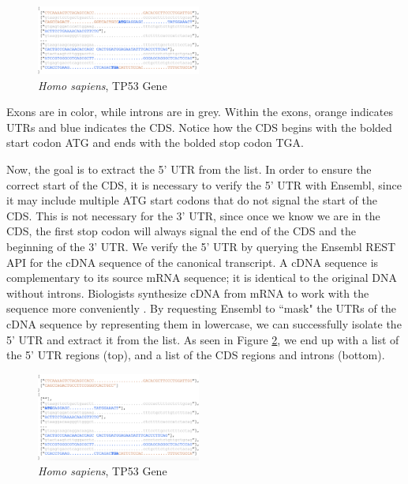 \documentclass[letterpaper]{article}
\begin{document}
\begin{figure}[h!]
\centering
\vspace{-3mm}
\includegraphics[width=0.48\textwidth]{images/pre_processed_seq_homo_sapiens_tp53_ABBREV}
  \caption{\textit{Homo sapiens}, TP53 Gene}\label{fig:pre_processed_seq_homo_sapiens_tp53}
  \vspace{-3mm}
\end{figure}

Exons are in color, while introns are in grey. Within the exons, orange indicates UTRs and blue indicates the CDS. Notice how the CDS begins with the bolded start codon ATG and ends with the bolded stop codon TGA. 

Now, the goal is to extract the 5' UTR from the list. In order to ensure the correct start of the CDS, it is necessary to verify the 5' UTR with Ensembl, since it may include multiple ATG start codons that do not signal the start of the CDS. This is not necessary for the 3' UTR, since once we know we are in the CDS, the first stop codon will always signal the end of the CDS and the beginning of the 3' UTR. We verify the 5' UTR by querying the Ensembl REST API for the cDNA sequence of the canonical transcript. A cDNA sequence is complementary to its source mRNA sequence; it is identical to the original DNA without introns. Biologists synthesize cDNA from mRNA to work with the sequence more conveniently \cite{ensembl_glossary}. By requesting Ensembl to ``mask" the UTRs of the cDNA sequence by representing them in lowercase, we can successfully isolate the 5' UTR and extract it from the list. As seen in Figure \ref{fig:post_processed_seq_homo_sapiens_tp53}, we end up with a list of the 5' UTR regions (top), and a list of the CDS regions and introns (bottom).

\begin{figure}[h!]
\centering
\vspace{-3mm}
\includegraphics[width=0.48\textwidth]{images/post_processed_seq_homo_sapiens_tp53_ABBREV}
  \caption{\textit{Homo sapiens}, TP53 Gene}\label{fig:post_processed_seq_homo_sapiens_tp53}
  \vspace{-3mm}
\end{figure}
\end{document}
